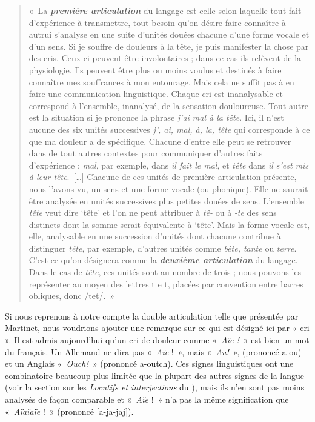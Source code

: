 {    \begin{quote}
    «~La \textbf{\textit{première articulation}} du langage est celle selon laquelle tout fait d’expérience à transmettre, tout besoin qu’on désire faire connaître à autrui s’analyse en une suite d’unités douées chacune d’une forme vocale et d’un sens. Si je souffre de douleurs à la tête, je puis manifester la chose par des cris. Ceux-ci peuvent être involontaires ; dans ce cas ils relèvent de la physiologie. Ils peuvent être plus ou moins voulus et destinés à faire connaître mes souffrances à mon entourage. Mais cela ne suffit pas à en faire une communication linguistique. Chaque cri est inanalysable et correspond à l’ensemble, inanalysé, de la sensation douloureuse. Tout autre est la situation si je prononce la phrase \textit{j’ai mal à la tête}. Ici, il n’est aucune des six unités successives \textit{j’, ai, mal, à, la, tête} qui corresponde à ce que ma douleur a de spécifique. Chacune d’entre elle peut se retrouver dans de tout autres contextes pour communiquer d’autres faits d’expérience : \textit{mal}, par exemple, dans \textit{il fait le mal}, et \textit{tête} dans \textit{il s’est mis à leur tête}.~[…] Chacune de ces unités de première articulation présente, nous l’avons vu, un sens et une forme vocale (ou phonique). Elle ne saurait être analysée en unités successives plus petites douées de sens. L’ensemble \textit{tête} veut dire ‘tête’ et l’on ne peut attribuer à \textit{tê-} ou à \textit{{}-te} des sens distincts dont la somme serait équivalente à ‘tête’. Mais la forme vocale est, elle, analysable en une succession d’unités dont chacune contribue à distinguer \textit{tête}, par exemple, d’autres unités comme \textit{bête, tante} ou \textit{terre}. C’est ce qu’on désignera comme la \textbf{\textit{deuxième articulation}} du langage. Dans le cas de \textit{tête}, ces unités sont au nombre de trois ; nous pouvons les représenter au moyen des lettres t e t, placées par convention entre barres obliques, donc /tet/.~»
    \end{quote}

    Si nous reprenons à notre compte la double articulation telle que présentée par Martinet, nous voudrions ajouter une remarque sur ce qui est désigné ici par « cri ». Il est admis aujourd’hui qu’un cri de douleur comme «~\textit{Aïe !}~» est bien un mot du français. Un Allemand ne dira pas «~\textit{Aïe} !~», mais «~\textit{Au!}~», (prononcé a-ou) et un Anglais «~\textit{Ouch!~}» (prononcé a-outch). Ces signes linguistiques ont une combinatoire beaucoup plus limitée que la plupart des autres signes de la langue (voir la section sur les \textit{Locutifs et interjections} du ), mais ils n’en sont pas moins analysés de façon comparable et «~\textit{Aïe} !~» n’a pas la même signification que «~\textit{Aïaïaïe} !~» (prononcé [a-ja-jaj]).
}
